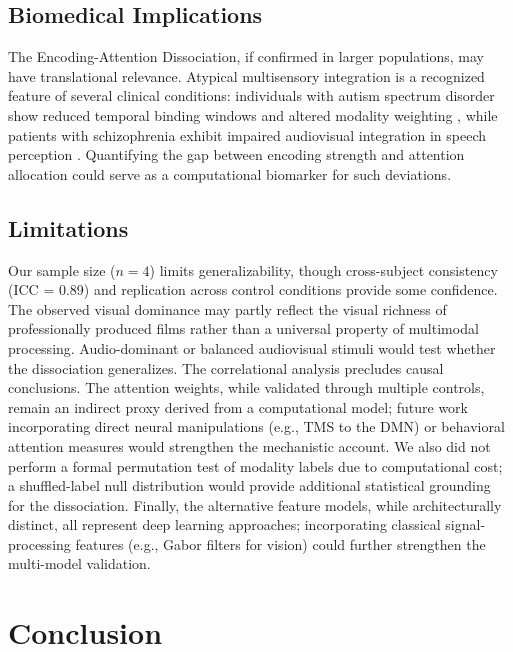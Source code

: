 \documentclass[conference]{IEEEtran}
\begin{document}
\subsection{Biomedical Implications}

The Encoding-Attention Dissociation, if confirmed in larger populations, may have translational relevance. Atypical multisensory integration is a recognized feature of several clinical conditions: individuals with autism spectrum disorder show reduced temporal binding windows and altered modality weighting \cite{stevenson2014multisensory}, while patients with schizophrenia exhibit impaired audiovisual integration in speech perception \cite{ross2007impaired}. Quantifying the gap between encoding strength and attention allocation could serve as a computational biomarker for such deviations.

\subsection{Limitations}

Our sample size ($n = 4$) limits generalizability, though cross-subject consistency (ICC = 0.89) and replication across control conditions provide some confidence. The observed visual dominance may partly reflect the visual richness of professionally produced films rather than a universal property of multimodal processing. Audio-dominant or balanced audiovisual stimuli would test whether the dissociation generalizes. The correlational analysis precludes causal conclusions. The attention weights, while validated through multiple controls, remain an indirect proxy derived from a computational model; future work incorporating direct neural manipulations (e.g., TMS to the DMN) or behavioral attention measures would strengthen the mechanistic account. We also did not perform a formal permutation test of modality labels due to computational cost; a shuffled-label null distribution would provide additional statistical grounding for the dissociation. Finally, the alternative feature models, while architecturally distinct, all represent deep learning approaches; incorporating classical signal-processing features (e.g., Gabor filters for vision) could further strengthen the multi-model validation.

\section{Conclusion}
\end{document}
